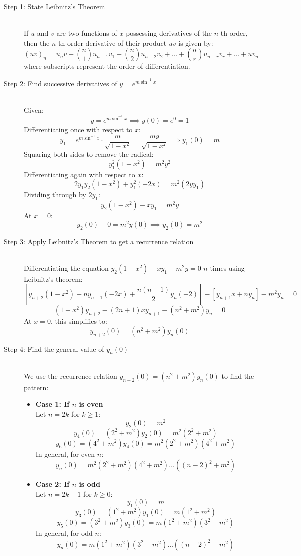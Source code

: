 \documentclass[11pt, a4paper]{article}
\begin{document}
\begin{description}
    \item[Step 1: State Leibnitz's Theorem] \ \\
    If $u$ and $v$ are two functions of $x$ possessing derivatives of the $n$-th order, then the $n$-th order derivative of their product $uv$ is given by:
    \[ (uv)_n = u_n v + \binom{n}{1} u_{n-1} v_1 + \binom{n}{2} u_{n-2} v_2 + \dots + \binom{n}{r} u_{n-r} v_r + \dots + u v_n \]
    where subscripts represent the order of differentiation.

    \item[Step 2: Find successive derivatives of $y = e^{m\sin^{-1}x}$] \ \\
    Given:
    \[ y = e^{m\sin^{-1}x} \implies y(0) = e^0 = 1 \]
    Differentiating once with respect to $x$:
    \[ y_1 = e^{m\sin^{-1}x} \cdot \frac{m}{\sqrt{1-x^2}} = \frac{my}{\sqrt{1-x^2}} \implies y_1(0) = m \]
    Squaring both sides to remove the radical:
    \[ y_1^2 (1-x^2) = m^2 y^2 \]
    Differentiating again with respect to $x$:
    \[ 2y_1 y_2 (1-x^2) + y_1^2 (-2x) = m^2 (2y y_1) \]
    Dividing through by $2y_1$:
    \[ y_2(1-x^2) - xy_1 = m^2 y \]
    At $x = 0$:
    \[ y_2(0) - 0 = m^2 y(0) \implies y_2(0) = m^2 \]

    \item[Step 3: Apply Leibnitz's Theorem to get a recurrence relation] \ \\
    Differentiating the equation $y_2(1-x^2) - xy_1 - m^2 y = 0$ $n$ times using Leibnitz's theorem:
    \[ \left[ y_{n+2}(1-x^2) + n y_{n+1}(-2x) + \frac{n(n-1)}{2} y_n (-2) \right] - \left[ y_{n+1}x + n y_n \right] - m^2 y_n = 0 \]
    \[ (1-x^2)y_{n+2} - (2n+1)xy_{n+1} - (n^2 + m^2) y_n = 0 \]
    At $x = 0$, this simplifies to:
    \[ y_{n+2}(0) = (n^2 + m^2)y_n(0) \]

    \item[Step 4: Find the general value of $y_n(0)$] \ \\
    We use the recurrence relation $y_{n+2}(0) = (n^2 + m^2)y_n(0)$ to find the pattern:
    \begin{itemize}
        \item \textbf{Case 1: If $n$ is even} \\
        Let $n = 2k$ for $k \ge 1$:
        \[ y_2(0) = m^2 \]
        \[ y_4(0) = (2^2 + m^2)y_2(0) = m^2(2^2 + m^2) \]
        \[ y_6(0) = (4^2 + m^2)y_4(0) = m^2(2^2 + m^2)(4^2 + m^2) \]
        In general, for even $n$:
        \[ y_n(0) = m^2(2^2 + m^2)(4^2 + m^2) \dots ((n-2)^2 + m^2) \]

        \item \textbf{Case 2: If $n$ is odd} \\
        Let $n = 2k+1$ for $k \ge 0$:
        \[ y_1(0) = m \]
        \[ y_3(0) = (1^2 + m^2)y_1(0) = m(1^2 + m^2) \]
        \[ y_5(0) = (3^2 + m^2)y_3(0) = m(1^2 + m^2)(3^2 + m^2) \]
        In general, for odd $n$:
        \[ y_n(0) = m(1^2 + m^2)(3^2 + m^2) \dots ((n-2)^2 + m^2) \]
    \end{itemize}
\end{description}
\end{document}
